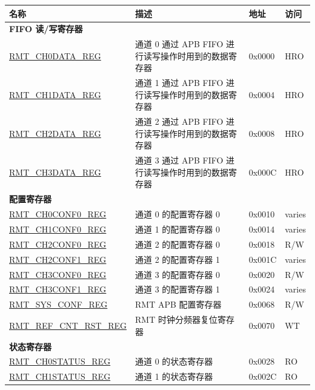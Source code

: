 \begin{longtable}{ | p{5.5cm} | p{6.8cm} | p{1.3cm} | p{1.5cm} | }
\hline\rowcolor{lightgray}
\textbf{名称} & \textbf{描述} & \textbf{地址} & \textbf{访问} \\ \hline
\endhead
\multicolumn{4}{|l|}{\textbf{FIFO 读/写寄存器}} \\ \hline
\hyperref[regdesc:RMTCHNDATAREG]{RMT\_CH0DATA\_REG} & 通道 0 通过 APB FIFO 进行读写操作时用到的数据寄存器 & 0x0000 & HRO \\ \hline
\hyperref[regdesc:RMTCHNDATAREG]{RMT\_CH1DATA\_REG} & 通道 1 通过 APB FIFO 进行读写操作时用到的数据寄存器 & 0x0004 & HRO \\ \hline
\hyperref[regdesc:RMTCHNDATAREG]{RMT\_CH2DATA\_REG} & 通道 2 通过 APB FIFO 进行读写操作时用到的数据寄存器 & 0x0008 & HRO \\ \hline
\hyperref[regdesc:RMTCHNDATAREG]{RMT\_CH3DATA\_REG} & 通道 3 通过 APB FIFO 进行读写操作时用到的数据寄存器 & 0x000C & HRO \\ \hline
\multicolumn{4}{|l|}{\textbf{配置寄存器}} \\ \hline
\hyperref[regdesc:RMTCHNCONF0REG]{RMT\_CH0CONF0\_REG} & 通道 0 的配置寄存器 0 & 0x0010 & varies \\ \hline
\hyperref[regdesc:RMTCHNCONF0REG]{RMT\_CH1CONF0\_REG} & 通道 1 的配置寄存器 0 & 0x0014 & varies \\ \hline
\hyperref[regdesc:RMTCHMCONF0REG]{RMT\_CH2CONF0\_REG} & 通道 2 的配置寄存器 0 & 0x0018 & R/W \\ \hline
\hyperref[regdesc:RMTCHMCONF1REG]{RMT\_CH2CONF1\_REG} & 通道 2 的配置寄存器 1 & 0x001C & varies \\ \hline
\hyperref[regdesc:RMTCHMCONF0REG]{RMT\_CH3CONF0\_REG} & 通道 3 的配置寄存器 0 & 0x0020 & R/W \\ \hline
\hyperref[regdesc:RMTCHMCONF1REG]{RMT\_CH3CONF1\_REG} & 通道 3 的配置寄存器 1 & 0x0024 & varies \\ \hline
\hyperref[regdesc:RMTSYSCONFREG]{RMT\_SYS\_CONF\_REG} & RMT APB 配置寄存器 & 0x0068 & R/W \\ \hline
\hyperref[regdesc:RMTREFCNTRSTREG]{RMT\_REF\_CNT\_RST\_REG} & RMT 时钟分频器复位寄存器 & 0x0070 & WT \\ \hline
\multicolumn{4}{|l|}{\textbf{状态寄存器}} \\ \hline
\hyperref[regdesc:RMTCHNSTATUSREG]{RMT\_CH0STATUS\_REG} & 通道 0 的状态寄存器 & 0x0028 & RO \\ \hline
\hyperref[regdesc:RMTCHNSTATUSREG]{RMT\_CH1STATUS\_REG} & 通道 1 的状态寄存器 & 0x002C & RO \\ \hline

\end{longtable}
